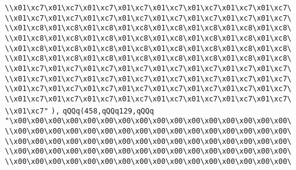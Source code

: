 \verb|\\x01\xc7\x01\xc7\x01\xc7\x01\xc7\x01\xc7\x01\xc7\x01\xc7\x01\xc7\|\newline
\verb|\\x01\xc7\x01\xc7\x01\xc7\x01\xc7\x01\xc7\x01\xc7\x01\xc7\x01\xc7\|\newline
\verb|\\x01\xc8\x01\xc8\x01\xc8\x01\xc8\x01\xc8\x01\xc8\x01\xc8\x01\xc8\|\newline
\verb|\\x01\xc8\x01\xc8\x01\xc8\x01\xc8\x01\xc8\x01\xc8\x01\xc8\x01\xc8\|\newline
\verb|\\x01\xc8\x01\xc8\x01\xc8\x01\xc8\x01\xc8\x01\xc8\x01\xc8\x01\xc8\|\newline
\verb|\\x01\xc8\x01\xc8\x01\xc8\x01\xc8\x01\xc8\x01\xc8\x01\xc8\x01\xc8\|\newline
\verb|\\x01\xc7\x01\xc7\x01\xc7\x01\xc7\x01\xc7\x01\xc7\x01\xc7\x01\xc7\|\newline
\verb|\\x01\xc7\x01\xc7\x01\xc7\x01\xc7\x01\xc7\x01\xc7\x01\xc7\x01\xc7\|\newline
\verb|\\x01\xc7\x01\xc7\x01\xc7\x01\xc7\x01\xc7\x01\xc7\x01\xc7\x01\xc7\|\newline
\verb|\\x01\xc7\x01\xc7\x01\xc7\x01\xc7\x01\xc7\x01\xc7\x01\xc7\x01\xc7\|\newline
\verb|\\x01\xc7"|\newline
\verb|),|\newline
\verb|qQQq(458,qQQq129,qQQq|\newline
\verb|"\x00\x00\x00\x00\x00\x00\x00\x00\x00\x00\x00\x00\x00\x00\x00\x00\|\newline
\verb|\\x00\x00\x00\x00\x00\x00\x00\x00\x00\x00\x00\x00\x00\x00\x00\x00\|\newline
\verb|\\x00\x00\x00\x00\x00\x00\x00\x00\x00\x00\x00\x00\x00\x00\x00\x00\|\newline
\verb|\\x00\x00\x00\x00\x00\x00\x00\x00\x00\x00\x00\x00\x00\x00\x00\x00\|\newline
\verb|\\x00\x00\x00\x00\x00\x00\x00\x00\x00\x00\x00\x00\x00\x00\x00\x00\|\newline
